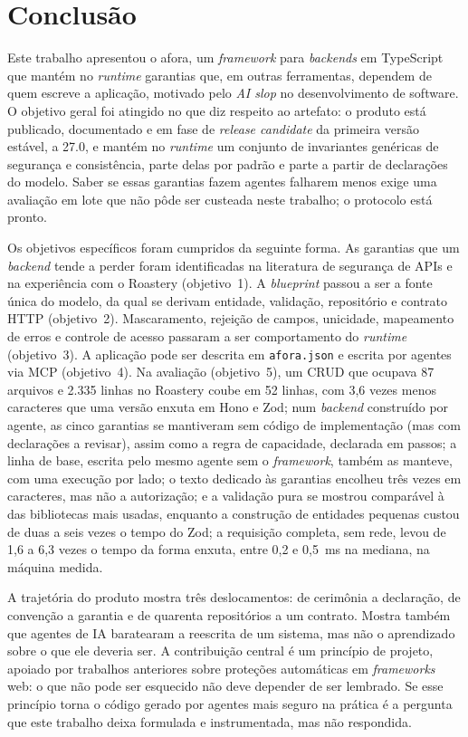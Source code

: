 \documentclass[a4paper,12pt]{article}
\newcommand{\estr}[1]{\textit{#1}}
\begin{document}
\section{Conclusão}\label{sec:conclusao}

Este trabalho apresentou o afora, um \estr{framework} para \estr{backends} em TypeScript que mantém no \estr{runtime} garantias que, em outras ferramentas, dependem de quem escreve a aplicação, motivado pelo \estr{AI slop} no desenvolvimento de software. O objetivo geral foi atingido no que diz respeito ao artefato: o produto está publicado, documentado e em fase de \estr{release candidate} da primeira versão estável, a 27.0, e mantém no \estr{runtime} um conjunto de invariantes genéricas de segurança e consistência, parte delas por padrão e parte a partir de declarações do modelo. Saber se essas garantias fazem agentes falharem menos exige uma avaliação em lote que não pôde ser custeada neste trabalho; o protocolo está pronto.

Os objetivos específicos foram cumpridos da seguinte forma. As garantias que um \estr{backend} tende a perder foram identificadas na literatura de segurança de APIs e na experiência com o Roastery (objetivo~1). A \estr{blueprint} passou a ser a fonte única do modelo, da qual se derivam entidade, validação, repositório e contrato HTTP (objetivo~2). Mascaramento, rejeição de campos, unicidade, mapeamento de erros e controle de acesso passaram a ser comportamento do \estr{runtime} (objetivo~3). A aplicação pode ser descrita em \texttt{afora.json} e escrita por agentes via MCP (objetivo~4). Na avaliação (objetivo~5), um CRUD que ocupava 87 arquivos e 2.335 linhas no Roastery coube em 52 linhas, com 3,6 vezes menos caracteres que uma versão enxuta em Hono e Zod; num \estr{backend} construído por agente, as cinco garantias se mantiveram sem código de implementação (mas com declarações a revisar), assim como a regra de capacidade, declarada em passos; a linha de base, escrita pelo mesmo agente sem o \estr{framework}, também as manteve, com uma execução por lado; o texto dedicado às garantias encolheu três vezes em caracteres, mas não a autorização; e a validação pura se mostrou comparável à das bibliotecas mais usadas, enquanto a construção de entidades pequenas custou de duas a seis vezes o tempo do Zod; a requisição completa, sem rede, levou de 1,6 a 6,3 vezes o tempo da forma enxuta, entre 0,2 e 0,5~ms na mediana, na máquina medida.

A trajetória do produto mostra três deslocamentos: de cerimônia a declaração, de convenção a garantia e de quarenta repositórios a um contrato. Mostra também que agentes de IA baratearam a reescrita de um sistema, mas não o aprendizado sobre o que ele deveria ser. A contribuição central é um princípio de projeto, apoiado por trabalhos anteriores sobre proteções automáticas em \estr{frameworks} web: o que não pode ser esquecido não deve depender de ser lembrado. Se esse princípio torna o código gerado por agentes mais seguro na prática é a pergunta que este trabalho deixa formulada e instrumentada, mas não respondida.
\end{document}
